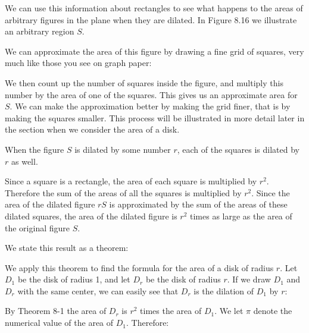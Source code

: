 \documentclass[12pt]{book} %
\begin{document}

We can use this information about rectangles to see what happens to the areas of arbitrary figures in the plane when they are dilated. In Figure 8.16 we illustrate an arbitrary region $S$.


We can approximate the area of this figure by drawing a fine grid of squares, very much like those you see on graph paper:


We then count up the number of squares inside the figure, and multiply this number by the area of one of the squares. This gives us an approximate area for $S$. We can make the approximation better by making the grid finer, that is by making the squares smaller. This process will be illustrated in more detail later in the section when we consider the area of a disk.

When the figure $S$ is dilated by some number $r$, each of the squares is dilated by $r$ as well.


Since a square is a rectangle, the area of each square is multiplied by $r^2$. Therefore the sum of the areas of all the squares is multiplied by $r^2$. Since the area of the dilated figure $rS$ is approximated by the sum of the areas of these dilated squares, the area of the dilated figure is $r^2$ times as large as the area of the original figure $S$.

We state this result as a theorem:


We apply this theorem to find the formula for the area of a disk of radius $r$. Let $D_1$ be the disk of radius 1, and let $D_r$ be the disk of radius $r$. If we draw $D_1$ and $D_r$ with the same center, we can easily see that $D_r$ is the dilation of $D_1$ by $r$:


By Theorem 8-1 the area of $D_r$ is $r^2$ times the area of $D_1$. We let $\pi$ denote the numerical value of the area of $D_1$. Therefore:

\end{document}
